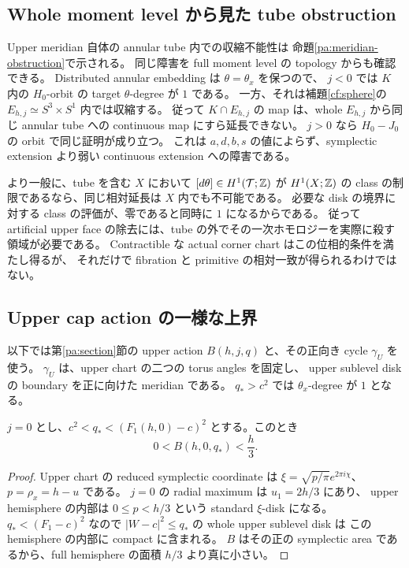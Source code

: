 \subsection{Whole moment level から見た tube obstruction}

Upper meridian 自体の annular tube 内での収縮不能性は
命題\ref{pa:meridian-obstruction}で示される。
同じ障害を full moment level の topology からも確認できる。
Distributed annular embedding は $\theta=\theta_x$ を保つので、
$j<0$ では $K$ 内の $H_0$-orbit の target $\theta$-degree が $1$ である。
一方、それは補題\ref{cf:sphere}の $E_{h,j}\simeq S^3\times S^1$ 内では収縮する。
従って $K\cap E_{h,j}$ の map は、whole $E_{h,j}$ から同じ annular tube への
continuous map にすら延長できない。
$j>0$ なら $H_0-J_0$ の orbit で同じ証明が成り立つ。
これは $a,d,b,s$ の値によらず、symplectic extension より弱い continuous extension への障害である。

より一般に、tube を含む $X$ において $[d\theta]\in H^1(\mathcal T;\mathbb Z)$ が
$H^1(X;\mathbb Z)$ の class の制限であるなら、同じ相対延長は $X$ 内でも不可能である。
必要な disk の境界に対する class の評価が、零であると同時に $1$ になるからである。
従って artificial upper face の除去には、tube の外でその一次ホモロジーを実際に殺す領域が必要である。
Contractible な actual corner chart はこの位相的条件を満たし得るが、
それだけで fibration と primitive の相対一致が得られるわけではない。

\subsection{Upper cap action の一様な上界}

以下では第\ref{pa:section}節の upper action $B(h,j,q)$ と、その正向き cycle $\gamma_U$ を使う。
$\gamma_U$ は、upper chart の二つの torus angles を固定し、
upper sublevel disk の boundary を正に向けた meridian である。
$q_*>c^2$ では $\theta_x$-degree が $1$ となる。

\begin{lemma}\label{cf:cap-area-bound}
$j=0$ とし、$c^2<q_*<(F_1(h,0)-c)^2$ とする。このとき
\[
 0<B(h,0,q_*)<\frac h3.
\]
\end{lemma}

\begin{proof}
Upper chart の reduced symplectic coordinate は
$\xi=\sqrt{p/\pi}e^{2\pi i\chi}$、$p=\rho_x=h-u$ である。
$j=0$ の radial maximum は $u_1=2h/3$ にあり、
upper hemisphere の内部は $0\le p<h/3$ という standard $\xi$-disk になる。
$q_*<(F_1-c)^2$ なので $|W-c|^2\le q_*$ の whole upper sublevel disk は
この hemisphere の内部に compact に含まれる。
$B$ はその正の symplectic area であるから、full hemisphere の面積 $h/3$ より真に小さい。
\end{proof}

